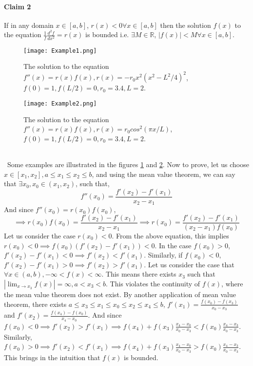 \documentclass{article}
\begin{document}
\paragraph{Claim 2} If in any domain $x \in [a,b]$, $r(x) < 0 \forall x \in [a,b]$ then the solution $f(x)$ to the equation $\frac{1}{f} \frac{d^2 f}{d x^2} = r(x)$ is bounded i.e. $\exists M \in \mathbb{R}$, $|f(x)|<M \forall x \in [a,b]$. \\
\begin{figure}
\begin{center}
\texttt{[image: Example1.png]}
\caption{\label{fig1} The solution to the equation $f''(x)=r(x)f(x), r(x) = -r_0 x^2 (x^2-L^2/4)^2$, $f(0)=1, f(L/2) = 0, r_0 = 3.4, L = 2$.}
\end{center}
\end{figure}
\begin{figure}
\begin{center}
\texttt{[image: Example2.png]}
\caption{\label{fig2} The solution to the equation $f''(x)=r(x)f(x), r(x) = r_0 cos^2(\pi x/L)$, $f(0)=1, f(L/2) = 0, r_0 = 3.4, L = 2$.}
\end{center}
\end{figure}
\\\
Some examples are illustrated in the figures \ref{fig1} and \ref{fig2}. Now to prove, let us choose $x \in [x_1, x_2], a\le x_1 \le x_2 \le b$, and using the mean value theorem, we can say that $\exists x_0, x_0 \in (x_1, x_2)$, such that,
\begin{equation*}
f''(x_0) = \frac{f'(x_2)-f'(x_1)}{x_2-x_1}
\end{equation*}
And since $f''(x_0) = r(x_0) f(x_0)$,
\begin{equation*}
\implies r(x_0) f(x_0) = \frac{f'(x_2)-f'(x_1)}{x_2-x_1} \implies r(x_0) = \frac{f'(x_2)-f'(x_1)}{(x_2-x_1) f(x_0)}
\end{equation*}
Let us consider the case $r(x_0)<0$. From the above equation, this implies $r(x_0)<0 \implies f(x_0)(f'(x_2)-f'(x_1))<0$. In the case $f(x_0) > 0$, $f'(x_2)-f'(x_1) < 0 \implies f'(x_2) < f'(x_1)$. Similarly, if $f(x_0) < 0$, $f'(x_2)-f'(x_1) > 0 \implies f'(x_2) > f'(x_1)$. Let us consider the case that $\forall x \in (a, b), -\infty < f(x) < \infty$. This means there exists $x_3$ such that $|\lim_{x\to x_3} f(x)| = \infty, a < x_3 < b$. This violates the continuity of $f(x)$, where the mean value theorem does not exist. By another application of mean value theorem, there exists $a \le x_3 \le x_1 \le x_0 \le x_2 \le x_4 \le b$, $f'(x_1) = \frac{f(x_0)-f(x_3)}{x_0 - x_3}$ and $f'(x_2) = \frac{f(x_4)-f(x_0)}{x_4 - x_0}$. And since $f(x_0) < 0 \implies f'(x_2) > f'(x_1) \implies f(x_4) + f(x_3)\frac{x_4-x_0}{x_0-x_3}< f(x_0)\frac{x_4-x_3}{x_0-x_3}$. Similarly, $f(x_0) > 0 \implies f'(x_2) < f'(x_1) \implies f(x_4) + f(x_3)\frac{x_4-x_0}{x_0-x_3} > f(x_0)\frac{x_4-x_3}{x_0-x_3}$. This brings in the intuition that $f(x)$ is bounded.\\ \\
\end{document}
